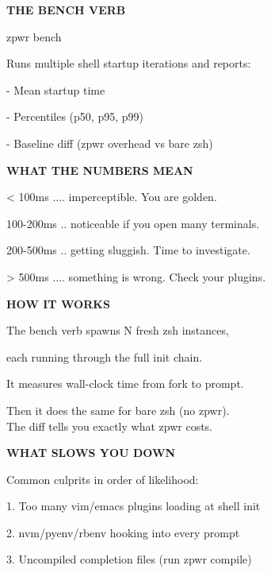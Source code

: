 \documentclass[11pt,a4paper,twoside]{book}
\begin{document}
\vspace{12pt}
{\bfseries\color{neonyellow} THE BENCH VERB}\vspace{4pt}

\begin{codebox}
zpwr bench\\
\end{codebox}

Runs multiple shell startup iterations and reports:

- Mean startup time

- Percentiles (p50, p95, p99)

- Baseline diff (zpwr overhead vs bare zsh)


\vspace{12pt}
{\bfseries\color{neonyellow} WHAT THE NUMBERS MEAN}\vspace{4pt}

< 100ms .... imperceptible. You are golden.

100-200ms .. noticeable if you open many terminals.

200-500ms .. getting sluggish. Time to investigate.

> 500ms .... something is wrong. Check your plugins.


\vspace{12pt}
{\bfseries\color{neonyellow} HOW IT WORKS}\vspace{4pt}

The bench verb spawns N fresh zsh instances,

each running through the full init chain.

It measures wall-clock time from fork to prompt.

\begin{codebox}
Then it does the same for bare zsh (no zpwr).\\
The diff tells you exactly what zpwr costs.\\
\end{codebox}


\vspace{12pt}
{\bfseries\color{neonyellow} WHAT SLOWS YOU DOWN}\vspace{4pt}

Common culprits in order of likelihood:

1. Too many vim/emacs plugins loading at shell init

2. nvm/pyenv/rbenv hooking into every prompt

\begin{codebox}
3. Uncompiled completion files (run zpwr compile)\\
\end{codebox}
\end{document}

